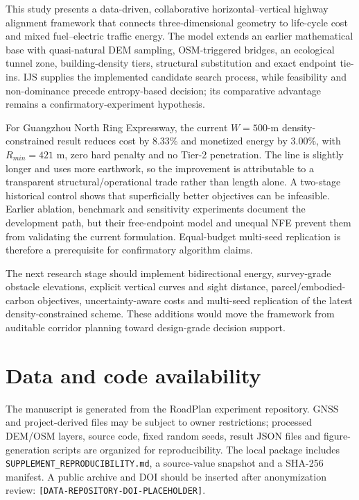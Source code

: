 \documentclass[preprint,12pt]{elsarticle}
\begin{document}
This study presents a data-driven, collaborative horizontal--vertical highway alignment framework that connects three-dimensional geometry to life-cycle cost and mixed fuel--electric traffic energy. The model extends an earlier mathematical base with quasi-natural DEM sampling, OSM-triggered bridges, an ecological tunnel zone, building-density tiers, structural substitution and exact endpoint tie-ins. IJS supplies the implemented candidate search process, while feasibility and non-dominance precede entropy-based decision; its comparative advantage remains a confirmatory-experiment hypothesis.

For Guangzhou North Ring Expressway, the current $W=500$-m density-constrained result reduces cost by 8.33\% and monetized energy by 3.00\%, with $R_{min}=421$ m, zero hard penalty and no Tier-2 penetration. The line is slightly longer and uses more earthwork, so the improvement is attributable to a transparent structural/operational trade rather than length alone. A two-stage historical control shows that superficially better objectives can be infeasible. Earlier ablation, benchmark and sensitivity experiments document the development path, but their free-endpoint model and unequal NFE prevent them from validating the current formulation. Equal-budget multi-seed replication is therefore a prerequisite for confirmatory algorithm claims.

The next research stage should implement bidirectional energy, survey-grade obstacle elevations, explicit vertical curves and sight distance, parcel/embodied-carbon objectives, uncertainty-aware costs and multi-seed replication of the latest density-constrained scheme. These additions would move the framework from auditable corridor planning toward design-grade decision support.

\section*{Data and code availability}
The manuscript is generated from the RoadPlan experiment repository. GNSS and project-derived files may be subject to owner restrictions; processed DEM/OSM layers, source code, fixed random seeds, result JSON files and figure-generation scripts are organized for reproducibility. The local package includes \texttt{SUPPLEMENT\_REPRODUCIBILITY.md}, a source-value snapshot and a SHA-256 manifest. A public archive and DOI should be inserted after anonymization review: \nolinkurl{[DATA-REPOSITORY-DOI-PLACEHOLDER]}.
\end{document}
